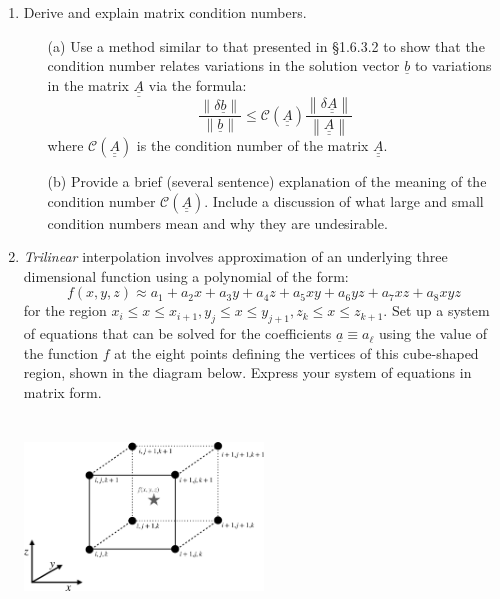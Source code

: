 \documentclass{article}
\begin{document}
\begin{enumerate}
    \item  Derive and explain matrix condition numbers.  
    \begin{itemize}
      \item[(a)]Use a method similar to that presented in \S 1.6.3.2 to show that the condition number relates variations in the solution vector $\underline{b}$ to variations in the matrix $\underline{\underline{A}}$ via the formula:
      \begin{equation}
      \frac{\left\| \delta \underline{b} \right\|}{ \left\| \underline{b} \right\| } \le   \mathcal{C} (\underline{\underline{A}}) \frac{ \left\| \delta \underline{\underline{A}}   \right\| }{\left\| \underline{\underline{A}} \right\|}
      \end{equation}
      where $\mathcal{C} (\underline{\underline{A}})$ is the condition number of the matrix $\underline{\underline{A}}$.      
    \item[(b)] Provide a brief (several sentence) explanation of the meaning of the condition number $\mathcal{C}(\underline{\underline{A}})$.  Include a discussion of what large and small condition numbers mean and why they are undesirable.  
    \end{itemize}
    
    \pagebreak
    
    \item \emph{Trilinear} interpolation involves approximation of an underlying three dimensional function using a polynomial of the form:  
    \begin{equation}
      f(x,y,z) \approx a_1 + a_2 x + a_3 y + a_4 z + a_5 x y + a_6 y z + a_7 x z + a_8 x y z
    \end{equation}
    for the region $x_i \le x \le x_{i+1}, y_j \le x \le y_{j+1}, z_k \le x \le z_{k+1}$.  Set up a system of equations that can be solved for the coefficients $\underline{a} \equiv a_\ell$ using the value of the function $f$ at the eight points defining the vertices of this cube-shaped region, shown in the diagram below.  Express your system of equations in matrix form.  \\~\\~\\
      \includegraphics[width=0.5\textwidth]{diagram_trilinear-crop.pdf}
    

\end{enumerate}
\end{document}
